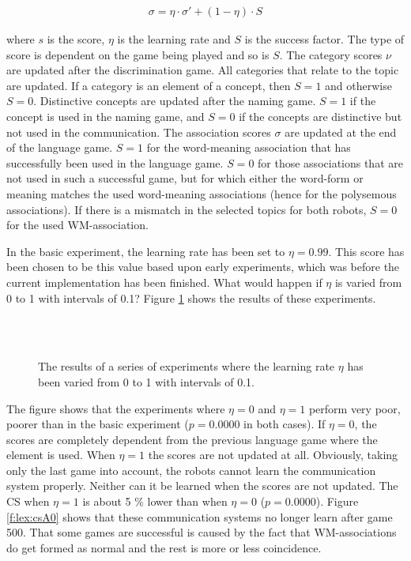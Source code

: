 \begin{eqnarray}
\sigma = \eta \cdot \sigma' + (1-\eta)\cdot S
\end{eqnarray}

\n
where $s$ is the score, $\eta$ is the learning rate and $S$ is the success factor. The type of score is dependent on the game being played and so is $S$. The category scores $\nu$ are updated after the discrimination game. All categories that relate to the topic are updated. If a category is an element of a concept, then $S=1$ and otherwise $S=0$. Distinctive concepts are updated after the naming game. $S=1$ if the concept is used in the naming game, and $S=0$ if the concepts are distinctive but not used in the communication. The association scores $\sigma$ are updated at the end of the language game. $S=1$ for the word-meaning association that has successfully been used in the language game. $S=0$ for those associations that are not used in such a successful game, but for which either the word-form or meaning matches the used word-meaning associations (hence for the polysemous associations). If there is a mismatch in the selected topics for both robots, $S=0$ for the used WM-association.

In the basic experiment, the learning rate has been set to $\eta=0.99$. This score has been chosen to be this value based upon early experiments, which was before the current implementation has been finished. What would happen if $\eta$ is varied from 0 to 1 with intervals of 0.1? Figure \ref{f:lex:A} shows the results of these experiments.

\begin{figure}
\\
\\
\caption{The results of a series of experiments where the learning rate $\eta$ has been varied from 0 to 1 with intervals of 0.1.}
\label{f:lex:A}
\end{figure}

\p
The figure shows that the experiments where $\eta=0$ and $\eta=1$ perform very poor, poorer than in the basic experiment ($p=0.0000$ in both cases). If $\eta=0$, the scores are completely dependent from the previous language game where the element is used. When $\eta=1$ the scores are not updated at all. Obviously, taking only the last game into account, the robots cannot learn the communication system properly. Neither can it be learned when the scores are not updated. The CS when $\eta=1$ is about 5 \% lower than when $\eta=0$ ($p=0.0000$). Figure \ref{f:lex:csA0} shows that these communication systems no longer learn after game 500. That some games are successful is caused by the fact that WM-associations do get formed as normal and the rest is more or less coincidence.


